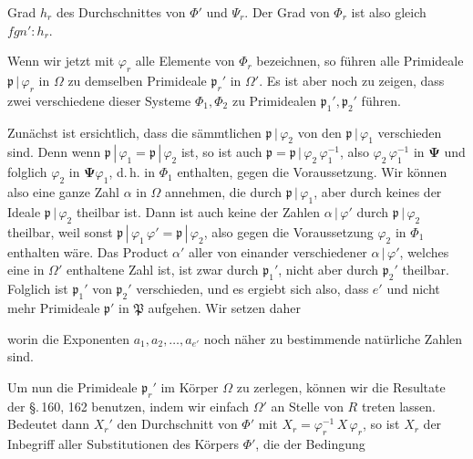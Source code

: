 Grad $h_r$ des Durchschnittes von $\Phi'$ und $\Psi_r$. Der Grad von $\Phi_r$
ist also gleich $f g n' : h_r$.

Wenn wir jetzt mit $\varphi_r$ alle Elemente von $\Phi_r$ bezeichnen, so
führen alle Primideale $\mathfrak{p}\,|\,\varphi_r$ in $\Omega$ zu demselben Primideale
$\mathfrak{p}_r'$ in $\Omega'$. Es ist aber noch zu zeigen, dass zwei verschiedene
dieser Systeme $\Phi_1, \Phi_2$ zu  Primidealen $\mathfrak{p}_1', \mathfrak{p}_2'$
führen.

Zunächst ist ersichtlich, dass die sämmtlichen $\mathfrak{p}\,|\,\varphi_2$ von den
$\mathfrak{p}\,|\,\varphi_1$ verschieden sind. Denn wenn $\mathfrak{p}\,|\,\varphi_1 = \mathfrak{p}\,|\,\varphi_2$ ist, so ist
auch $\mathfrak{p} = \mathfrak{p}\,|\,\varphi_2\,\varphi_1^{-1}$, also $\varphi_2\,\varphi_1^{-1}$ in $\boldsymbol{\Psi}$ und folglich $\varphi_2$ in
$\boldsymbol{\Psi}\varphi_1$, d.\,h. in $\Phi_1$ enthalten, gegen die Voraussetzung. Wir
können also eine ganze Zahl $\alpha$ in $\Omega$ annehmen, die durch
$\mathfrak{p}\,|\,\varphi_1$, aber durch keines der Ideale $\mathfrak{p}\,|\,\varphi_2$ theilbar ist. Dann
ist auch keine der Zahlen $\alpha\,|\,\varphi'$ durch $\mathfrak{p}\,|\,\varphi_2$ theilbar, weil sonst
$\mathfrak{p}\,|\,\varphi_1\,\varphi' = \mathfrak{p}\,|\,\varphi_2$, also gegen die Voraussetzung $\varphi_2$ in $\Phi_1$
enthalten wäre. Das Product $\alpha'$ aller von einander verschiedener
$\alpha\,|\,\varphi'$, welches eine in $\Omega'$ enthaltene Zahl ist, ist zwar durch
$\mathfrak{p}_1'$, nicht aber durch $\mathfrak{p}_2'$ theilbar. Folglich ist $\mathfrak{p}_1'$ von $\mathfrak{p}_2'$
verschieden, und es ergiebt sich also, dass $e'$ und
nicht mehr  Primideale $\mathfrak{p}'$ in $\mathfrak{P}$ aufgehen.
Wir setzen daher


worin die Exponenten $a_1, a_2, \ldots, a_{e'}$ noch näher zu bestimmende
natürliche Zahlen sind.

Um nun die Primideale $\mathfrak{p}_r'$ im Körper $\Omega$ zu zerlegen, können
wir die Resultate der \S.\,160, 162 benutzen, indem wir einfach
$\Omega'$ an Stelle von $R$ treten lassen. Bedeutet dann $X_r'$ den Durchschnitt
 von $\Phi'$ mit $X_r = \varphi_r^{-1}\,X\,\varphi_r$, so ist $X_r$ der Inbegriff aller %
Substitutionen des Körpers $\Phi'$, die der Bedingung

